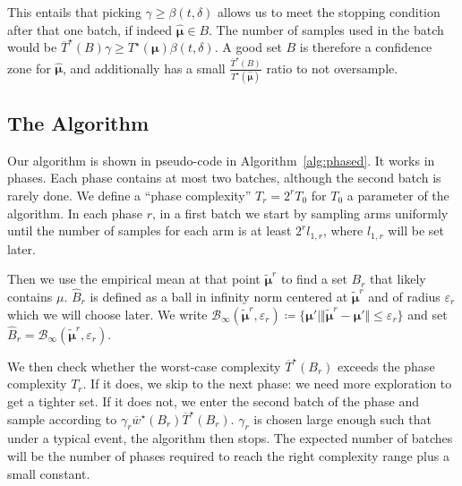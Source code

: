 This entails that picking $\gamma \ge \beta(t,\delta)$ allows us to meet the stopping condition after that one batch, if indeed $\hat{\bm\mu} \in B$.
The number of samples used in the batch would be $\overline{T}^\star(B) \gamma \ge T^\star(\bm \mu) \beta(t,\delta)$.
A good set $B$ is therefore a confidence zone for $\bm{\hat{\mu}}$, and additionally has a small $\frac{\overline{T}^\star(B)}{T^\star(\bm{\hat{\mu}})}$ ratio to not oversample.





\subsection{The Algorithm}


Our algorithm is shown in pseudo-code in Algorithm~\ref{alg:phased}. It works in phases.
Each phase contains at most two batches, although the second batch is rarely done.
We define a ``phase complexity'' $T_r = 2^r T_0$ for $T_0$ a parameter of the algorithm.
In each phase $r$, in a first batch we start by sampling arms uniformly until the number of samples for each arm is at least $2^r l_{1,r}$, where $l_{1,r}$ will be set later.

Then we use the empirical mean at that point $\tilde{\bm\mu}^r$ to find a set $B_r$ that likely contains $\mu$.
$\hat{B}_r$ is defined as a ball in infinity norm centered at $\tilde{\bm\mu}^r$ and of radius $\varepsilon_r$ which we will choose later.
We write $\mathcal B_\infty(\tilde{\bm\mu}^r, \varepsilon_r) \coloneqq \{\bm\mu' \mid \Vert \tilde{\bm\mu}^r - \bm\mu' \Vert \le \varepsilon_r\}$ and set $\hat{B}_r = \mathcal B_\infty(\tilde{\bm\mu}^r, \varepsilon_r)$.

We then check whether the worst-case complexity $\overline{T}^\star(B_r)$ exceeds the phase complexity $T_r$.
If it does, we skip to the next phase: we need more exploration to get a tighter set.
If it does not, we enter the second batch of the phase and sample according to $\gamma_r \overline{w}^\star(B_r)\overline{T}^\star(B_r)$.
$\gamma_r$ is chosen large enough such that under a typical event, the algorithm then stops.
The expected number of batches will be the number of phases required to reach the right complexity range plus a small constant.

